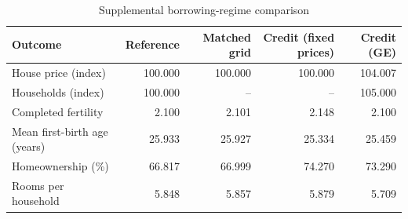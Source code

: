 \begin{table}[!htbp]
\centering
\caption{Supplemental borrowing-regime comparison}
\label{tab:borrowing-comparison}
\begin{tabular}{lrrrr}
\toprule
Outcome & Reference & Matched grid & Credit (fixed prices) & Credit (GE) \\
\midrule
House price (index) & 100.000 & 100.000 & 100.000 & 104.007 \\
Households (index) & 100.000 & -- & -- & 105.000 \\
Completed fertility & 2.100 & 2.101 & 2.148 & 2.100 \\
Mean first-birth age (years) & 25.933 & 25.927 & 25.334 & 25.459 \\
Homeownership (\%) & 66.817 & 66.999 & 74.270 & 73.290 \\
Rooms per household & 5.848 & 5.857 & 5.879 & 5.709 \\
\bottomrule
\end{tabular}
\par{}
\end{table}
